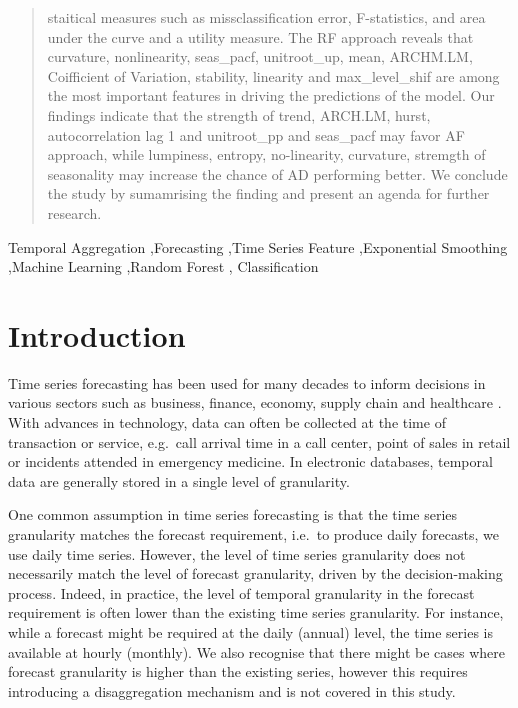 \documentclass[preprint, 3p,
authoryear]{elsarticle} %
\begin{document}
\begin{frontmatter}
\begin{abstract}
  staitical measures such as missclassification error, F-statistics, and
  area under the curve and a utility measure. The RF approach reveals
  that curvature, nonlinearity, seas\_pacf, unitroot\_up, mean,
  ARCHM.LM, Coifficient of Variation, stability, linearity and
  max\_level\_shif are among the most important features in driving the
  predictions of the model. Our findings indicate that the strength of
  trend, ARCH.LM, hurst, autocorrelation lag 1 and unitroot\_pp and
  seas\_pacf may favor AF approach, while lumpiness, entropy,
  no-linearity, curvature, stremgth of seasonality may increase the
  chance of AD performing better. We conclude the study by sumamrising
  the finding and present an agenda for further research.
  \end{abstract}
    \begin{keyword}
    Temporal Aggregation \sep Forecasting \sep Time Series
Feature \sep Exponential Smoothing \sep Machine Learning \sep Random
Forest \sep 
    Classification
  \end{keyword}
  
 \end{frontmatter}

\hypertarget{introduction}{%
\section{Introduction}\label{introduction}}

Time series forecasting has been used for many decades to inform
decisions in various sectors such as business, finance, economy, supply
chain and healthcare \citep{petropoulos2022forecasting}. With advances
in technology, data can often be collected at the time of transaction or
service, e.g.~call arrival time in a call center, point of sales in
retail or incidents attended in emergency medicine. In electronic
databases, temporal data are generally stored in a single level of
granularity.

One common assumption in time series forecasting is that the time series
granularity matches the forecast requirement, i.e.~to produce daily
forecasts, we use daily time series. However, the level of time series
granularity does not necessarily match the level of forecast
granularity, driven by the decision-making process. Indeed, in practice,
the level of temporal granularity in the forecast requirement is often
lower than the existing time series granularity. For instance, while a
forecast might be required at the daily (annual) level, the time series
is available at hourly (monthly). We also recognise that there might be
cases where forecast granularity is higher than the existing series,
however this requires introducing a disaggregation mechanism and is not
covered in this study.
\end{document}
